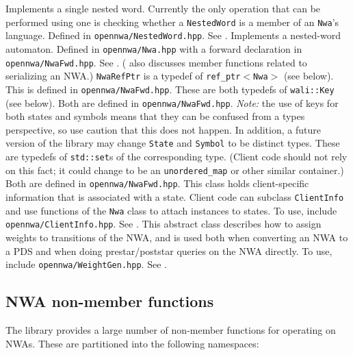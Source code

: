 \begin{functionlist}
   Implements a single nested word. Currently the only
    operation that can be performed using one is checking whether a
    \texttt{NestedWord} is a member of an \texttt{Nwa}'s language. Defined in
    \texttt{opennwa/NestedWord.hpp}. See .
   Implements a nested-word automaton. Defined in
    \texttt{opennwa/Nwa.hpp} with a forward declaration in \texttt{opennwa/NwaFwd.hpp}.
    See
    . ( also discusses member
    functions related to serializing an NWA.)
   \texttt{NwaRefPtr} is a typedef of \texttt{ref\_ptr$<$Nwa$>$} (see
    below). This is defined in \texttt{opennwa/NwaFwd.hpp}.
   These are both typedefs of
    \texttt{wali::Key} (see below). Both are defined in
    \texttt{opennwa/NwaFwd.hpp}. \emph{Note:} the use of keys for both
    states and symbols means that they can be confused from a types
    perspective, so use caution that this does not happen. In addition, a
    future version of the library may change \texttt{State} and
    \texttt{Symbol} to be distinct types.
   These are typedefs of
    \texttt{std::set}s of the corresponding type. (Client code should not
    rely on this
    fact; it could change to be an \texttt{unordered\_map} or other similar
    container.) Both are defined in \texttt{opennwa/NwaFwd.hpp}.
   This class holds client-specific information that
    is associated with a state. Client code can subclass \texttt{ClientInfo} and use
    functions of the \texttt{Nwa} class to attach instances to states. To use,
    include \texttt{opennwa/ClientInfo.hpp}. See .
   This abstract class describes how to assign weights
    to transitions of the NWA, and is used both when converting an NWA to a
    PDS and when doing prestar/poststar queries on the NWA directly. To use,
    include \texttt{opennwa/WeightGen.hpp}. See .
\end{functionlist}


\subsection{NWA non-member functions}

The library provides a large number of non-member functions for operating on
NWAs. These are partitioned into the following namespaces:

